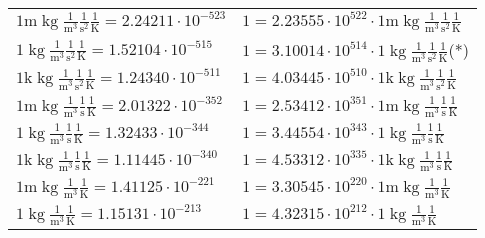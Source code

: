 \begin{center}
\begin{longtable}{l l}
\hline{\color{gray}$1 \bm{\mathrm{ m}}\operatorname{kg}\frac1{\operatorname{m}^3}\frac1{\operatorname{s}^2}{}\frac1{\operatorname{K}} = 2.24211\cdot10^{-523} $}   & {\color{gray}$ 1 = 2.23555\cdot10^{522} \cdot 1 \bm{\mathrm{ m}}\operatorname{kg}\frac1{\operatorname{m}^3}\frac1{\operatorname{s}^2}{}\frac1{\operatorname{K}}$}  \\
{\color{black}$1 \bm{\mathrm{ }}\operatorname{kg}\frac1{\operatorname{m}^3}\frac1{\operatorname{s}^2}{}\frac1{\operatorname{K}} = 1.52104\cdot10^{-515} $}   & {\color{black}$ 1 = 3.10014\cdot10^{514} \cdot 1 \bm{\mathrm{ }}\operatorname{kg}\frac1{\operatorname{m}^3}\frac1{\operatorname{s}^2}{}\frac1{\operatorname{K}}$}\quad(*)\\
{\color{gray}$1 \bm{\mathrm{ k}}\operatorname{kg}\frac1{\operatorname{m}^3}\frac1{\operatorname{s}^2}{}\frac1{\operatorname{K}} = 1.24340\cdot10^{-511} $}   & {\color{gray}$ 1 = 4.03445\cdot10^{510} \cdot 1 \bm{\mathrm{ k}}\operatorname{kg}\frac1{\operatorname{m}^3}\frac1{\operatorname{s}^2}{}\frac1{\operatorname{K}}$}  \\
{\color{gray}$1 \bm{\mathrm{ m}}\operatorname{kg}\frac1{\operatorname{m}^3}\frac1{\operatorname{s}}{}\frac1{\operatorname{K}} = 2.01322\cdot10^{-352} $}   & {\color{gray}$ 1 = 2.53412\cdot10^{351} \cdot 1 \bm{\mathrm{ m}}\operatorname{kg}\frac1{\operatorname{m}^3}\frac1{\operatorname{s}}{}\frac1{\operatorname{K}}$}  \\
{\color{black}$1 \bm{\mathrm{ }}\operatorname{kg}\frac1{\operatorname{m}^3}\frac1{\operatorname{s}}{}\frac1{\operatorname{K}} = 1.32433\cdot10^{-344} $}   & {\color{black}$ 1 = 3.44554\cdot10^{343} \cdot 1 \bm{\mathrm{ }}\operatorname{kg}\frac1{\operatorname{m}^3}\frac1{\operatorname{s}}{}\frac1{\operatorname{K}}$}  \\
{\color{gray}$1 \bm{\mathrm{ k}}\operatorname{kg}\frac1{\operatorname{m}^3}\frac1{\operatorname{s}}{}\frac1{\operatorname{K}} = 1.11445\cdot10^{-340} $}   & {\color{gray}$ 1 = 4.53312\cdot10^{335} \cdot 1 \bm{\mathrm{ k}}\operatorname{kg}\frac1{\operatorname{m}^3}\frac1{\operatorname{s}}{}\frac1{\operatorname{K}}$}  \\
{\color{gray}$1 \bm{\mathrm{ m}}\operatorname{kg}\frac1{\operatorname{m}^3}{}{}\frac1{\operatorname{K}} = 1.41125\cdot10^{-221} $}   & {\color{gray}$ 1 = 3.30545\cdot10^{220} \cdot 1 \bm{\mathrm{ m}}\operatorname{kg}\frac1{\operatorname{m}^3}{}{}\frac1{\operatorname{K}}$}  \\
{\color{black}$1 \bm{\mathrm{ }}\operatorname{kg}\frac1{\operatorname{m}^3}{}{}\frac1{\operatorname{K}} = 1.15131\cdot10^{-213} $}   & {\color{black}$ 1 = 4.32315\cdot10^{212} \cdot 1 \bm{\mathrm{ }}\operatorname{kg}\frac1{\operatorname{m}^3}{}{}\frac1{\operatorname{K}}$}  \\

\end{longtable}
\end{center}
